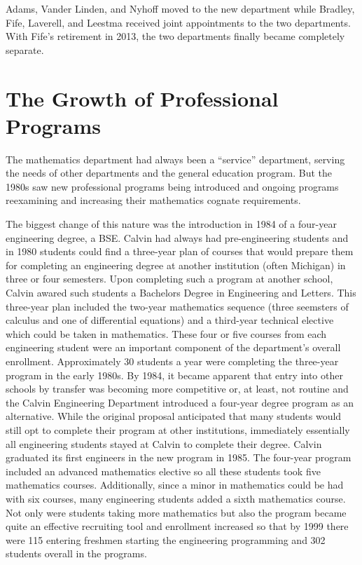 \documentclass[
]{book}
\begin{document}
Adams, Vander Linden, and Nyhoff moved to the new department while Bradley, Fife, Laverell, and Leestma received joint appointments to the two departments. With Fife's retirement in 2013, the two departments finally became completely separate.

\hypertarget{the-growth-of-professional-programs}{%
\section{The Growth of Professional Programs}\label{the-growth-of-professional-programs}}

The mathematics department had always been a ``service'' department, serving the needs of other departments and the general education program. But the 1980s saw new professional programs being introduced and ongoing programs reexamining and increasing their mathematics cognate requirements.

The biggest change of this nature was the introduction in 1984 of a four-year engineering degree, a BSE. Calvin had always had pre-engineering students and in 1980 students could find a three-year plan of courses that would prepare them for completing an engineering degree at another institution (often Michigan) in three or four semesters. Upon completing such a program at another school, Calvin awared such students a Bachelors Degree in Engineering and Letters. This three-year plan included the two-year mathematics sequence (three seemsters of calculus and one of differential equations) and a third-year technical elective which could be taken in mathematics. These four or five courses from each engineering student were an important component of the department's overall enrollment. Approximately 30 students a year were completing the three-year program in the early 1980s. By 1984, it became apparent that entry into other schools by transfer was becoming more competitive or, at least, not routine and the Calvin Engineering Department introduced a four-year degree program as an alternative. While the original proposal anticipated that many students would still opt to complete their program at other institutions, immediately essentially all engineering students stayed at Calvin to complete their degree. Calvin graduated its first engineers in the new program in 1985. The four-year program included an advanced mathematics elective so all these students took five mathematics courses. Additionally, since a minor in mathematics could be had with six courses, many engineering students added a sixth mathematics course. Not only were students taking more mathematics but also the program became quite an effective recruiting tool and enrollment increased so that by 1999 there were 115 entering freshmen starting the engineering programming and 302 students overall in the programs.
\end{document}
